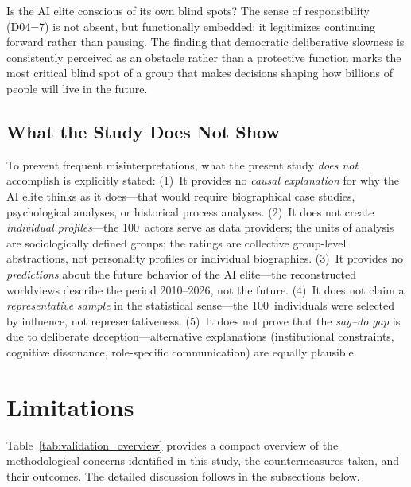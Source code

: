 \documentclass[12pt,a4paper]{article}
\begin{document}
Is the AI elite conscious of its own blind spots? The sense of responsibility (D04=7) is not absent, but functionally embedded: it legitimizes continuing forward rather than pausing. The finding that democratic deliberative slowness is consistently perceived as an obstacle rather than a protective function marks the most critical blind spot of a group that makes decisions shaping how billions of people will live in the future.


\subsection{What the Study Does Not Show}
\label{sec:diskussion:negativ}

To prevent frequent misinterpretations, what the present study \emph{does not} accomplish is explicitly stated: (1)~It provides no \emph{causal explanation} for why the AI elite thinks as it does---that would require biographical case studies, psychological analyses, or historical process analyses. (2)~It does not create \emph{individual profiles}---the 100~actors serve as data providers; the units of analysis are sociologically defined groups; the ratings are collective group-level abstractions, not personality profiles or individual biographies. (3)~It provides no \emph{predictions} about the future behavior of the AI elite---the reconstructed worldviews describe the period 2010--2026, not the future. (4)~It does not claim a \emph{representative sample} in the statistical sense---the 100~individuals were selected by influence, not representativeness. (5)~It does not prove that the \emph{say--do gap} is due to deliberate deception---alternative explanations (institutional constraints, cognitive dissonance, role-specific communication) are equally plausible.


\section{Limitations}
\label{sec:limitationen}

Table~\ref{tab:validation_overview} provides a compact overview of the methodological concerns identified in this study, the countermeasures taken, and their outcomes. The detailed discussion follows in the subsections below.
\end{document}
